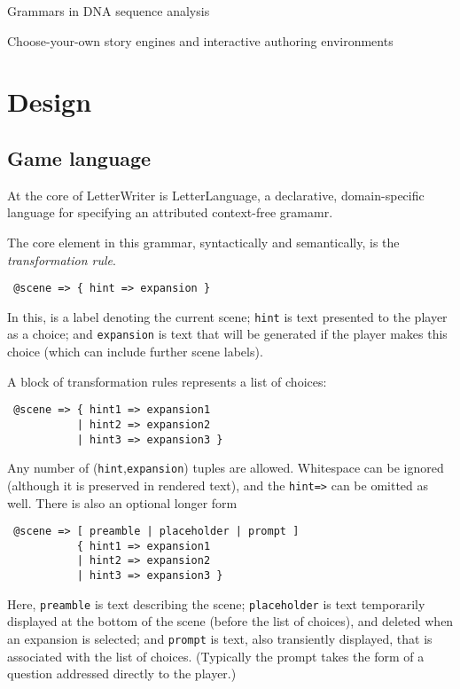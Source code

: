 \documentclass{acm_proc_article-sp}
\begin{document}
Grammars in DNA sequence analysis
\cite{Durbin98}

Choose-your-own story engines and interactive authoring environments
\cite{Twine,InkleWriter,ChoiceScript,Undum,RenPy}


\section{Design}

\subsection{Game language}

At the core of LetterWriter is LetterLanguage,
a declarative, domain-specific language for specifying an attributed context-free gramamr.

The core element in this grammar, syntactically and semantically, is the {\em transformation rule}.
\begin{verbatim}
 @scene => { hint => expansion }
\end{verbatim}
In this, {\tt \@scene} is a label denoting the current scene;
{\tt hint} is text presented to the player as a choice;
and {\tt expansion} is text that will be generated if the player makes this choice
(which can include further scene labels).

A block of transformation rules represents a list of choices:
\begin{verbatim}
 @scene => { hint1 => expansion1
           | hint2 => expansion2
           | hint3 => expansion3 }
\end{verbatim}
Any number of ({\tt hint},{\tt expansion}) tuples are allowed.
Whitespace can be ignored (although it is preserved in rendered text),
and the {\tt hint=>} can be omitted as well.
There is also an optional longer form
\begin{verbatim}
 @scene => [ preamble | placeholder | prompt ]
           { hint1 => expansion1
           | hint2 => expansion2
           | hint3 => expansion3 }
\end{verbatim}

Here, {\tt preamble} is text describing the scene;
{\tt placeholder} is text temporarily displayed at the bottom of the scene (before the list of choices),
and deleted when an expansion is selected;
and {\tt prompt} is text, also transiently displayed, that is associated with the list of choices.
(Typically the prompt takes the form of a question addressed directly to the player.)
\end{document}
